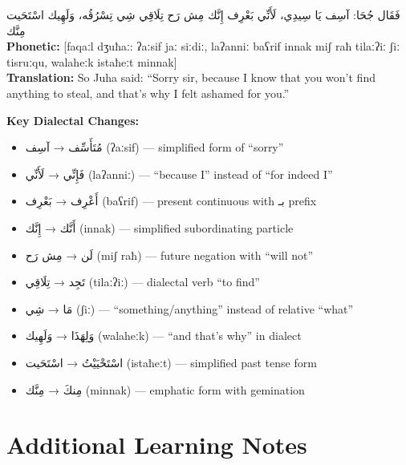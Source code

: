 \documentclass[letterpaper,12pt]{article}
\begin{document}
\begin{tcolorbox}[colback=white,colframe=dialectcolor,title=\textbf{Levantine Version},breakable]
\textarabic{فَقَال جُحَا: آسِف يَا سِيدِي، لَأَنِّي بَعْرِف إِنَّك مِش رَح تِلَاقِي شِي تِسْرُقُه، وَلَهِيك اسْتَحَيت مِنَّك}\\
\textbf{Phonetic:} [faqaːl dʒuħaː: ʔaːsif jaː siːdiː, laʔanniː baʕrif innak miʃ raħ tilaːʔiː ʃiː tisruːqu, walaheːk istaħeːt minnak]\\
\textbf{Translation:} So Juha said: ``Sorry sir, because I know that you won't find anything to steal, and that's why I felt ashamed for you.''
\end{tcolorbox}
\textbf{Key Dialectal Changes:}
\begin{itemize}
\item \textarabic{مُتَأَسِّف} → \textarabic{آسِف} (ʔaːsif) — simplified form of ``sorry''
\item \textarabic{فَإِنِّي} → \textarabic{لَأَنِّي} (laʔanniː) — ``because I'' instead of ``for indeed I''
\item \textarabic{أَعْرِف} → \textarabic{بَعْرِف} (baʕrif) — present continuous with \textarabic{بـ} prefix
\item \textarabic{أَنَّك} → \textarabic{إِنَّك} (innak) — simplified subordinating particle
\item \textarabic{لَن} → \textarabic{مِش رَح} (miʃ raħ) — future negation with ``will not''
\item \textarabic{تَجِد} → \textarabic{تِلَاقِي} (tilaːʔiː) — dialectal verb ``to find''
\item \textarabic{مَا} → \textarabic{شِي} (ʃiː) — ``something/anything'' instead of relative ``what''
\item \textarabic{وَلِهَذَا} → \textarabic{وَلَهِيك} (walaheːk) — ``and that's why'' in dialect
\item \textarabic{اسْتَحْيَيْتُ} → \textarabic{اسْتَحَيت} (istaħeːt) — simplified past tense form
\item \textarabic{مِنكَ} → \textarabic{مِنَّك} (minnak) — emphatic form with gemination
\end{itemize}

\section{Additional Learning Notes}
\end{document}
